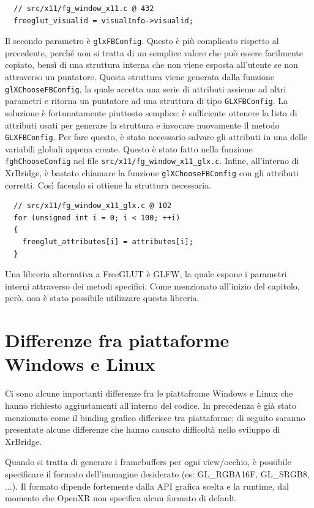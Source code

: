 \documentclass[twoside]{supsistudent}
\begin{document}
\begin{verbatim}
  // src/x11/fg_window_x11.c @ 432
  freeglut_visualid = visualInfo->visualid;
\end{verbatim}

Il secondo parametro è \texttt{glxFBConfig}. Questo è più complicato rispetto al precedente, perché non si tratta di un semplice valore che può essere facilmente copiato, bensì di una struttura interna che non viene esposta all'utente se non attraverso un puntatore. Questa struttura viene generata dalla funzione \texttt{glXChooseFBConfig}, la quale accetta una serie di attributi assieme ad altri parametri e ritorna un puntatore ad una struttura di tipo \texttt{GLXFBConfig}. La soluzione è fortunatamente piuttosto semplice: è sufficiente ottenere la lista di attributi usati per generare la struttura e invocare nuovamente il metodo \texttt{GLXFBConfig}. Per fare questo, è stato necessario salvare gli attributi in una delle variabili globali appena create. Questo è stato fatto nella funzione \texttt{fghChooseConfig} nel file \texttt{src/x11/fg\_window\_x11\_glx.c}. Infine, all'interno di XrBridge, è bastato chiamare la funzione \texttt{glXChooseFBConfig} con gli attributi corretti. Così facendo si ottiene la struttura necessaria.

\begin{verbatim}
  // src/x11/fg_window_x11_glx.c @ 102
  for (unsigned int i = 0; i < 100; ++i)
  {
    freeglut_attributes[i] = attributes[i];
  }
\end{verbatim}

Una libreria alternativa a FreeGLUT è GLFW, la quale espone i parametri interni attraverso dei metodi specifici. Come menzionato all'inizio del capitolo, però, non è stato possibile utilizzare questa libreria.

\section{Differenze fra piattaforme Windows e Linux}

Ci sono alcune importanti differenze fra le piattafrome Windows e Linux che hanno richiesto aggiustamenti all'interno del codice. In precedenza è già stato menzionato come il binding grafico differisce tra piattaforme; di seguito saranno presentate alcune differenze che hanno causato difficoltà nello sviluppo di XrBridge.

Quando si tratta di generare i framebuffers per ogni view/occhio, è possibile specificare il formato dell'immagine desiderato (es: GL\_RGBA16F, GL\_SRGB8, ...). Il formato dipende fortemente dalla API grafica scelta e la runtime, dal momento che OpenXR non specifica alcun formato di default.
\end{document}
